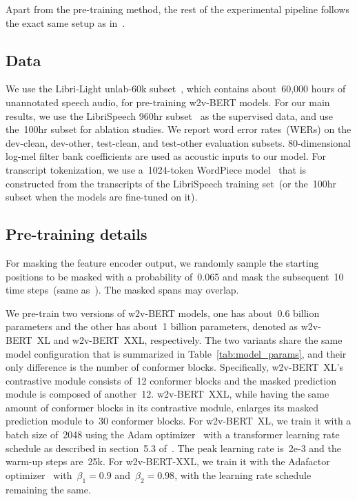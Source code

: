 \documentclass{article}
\begin{document}
Apart from the pre-training method, the rest of the experimental pipeline follows the exact same setup as in~\cite{zhang2020pushing}.

\subsection{Data}
We use the Libri-Light unlab-60k subset~\cite{kahn2020libri}, which contains about~60,000 hours of unannotated speech audio, for pre-training w2v-BERT models.
For our main results, we use the LibriSpeech 960hr subset~\cite{panayotov2015librispeech} as the supervised data, and use the~100hr subset for ablation studies.
We report word error rates~(WERs) on the dev-clean, dev-other, test-clean, and test-other evaluation subsets.
80-dimensional log-mel filter bank coefficients are used as acoustic inputs to our model.
For transcript tokenization, we use a~1024-token WordPiece model~\cite{schuster2012japanese} that is constructed from the transcripts of the LibriSpeech training set~(or the~100hr subset when the models are fine-tuned on it).

\subsection{Pre-training details}
 For masking the feature encoder output, we randomly sample the starting positions to be masked with a probability of~0.065 and mask the subsequent~10 time steps~(same as~\cite{baevski2020wav2vec,zhang2020pushing}).
The masked spans may overlap.

 We pre-train two versions of w2v-BERT models, one has about~0.6 billion parameters and the other has about~1 billion parameters, denoted as w2v-BERT~XL and w2v-BERT~XXL, respectively.
The two variants share the same model configuration that is summarized in Table~\ref{tab:model_params}, and their only difference is the number of conformer blocks.
Specifically, w2v-BERT~XL's contrastive module consists of~12 conformer blocks and the masked prediction module is composed of another~12.
w2v-BERT~XXL, while having the same amount of conformer blocks in its contrastive module, enlarges its masked prediction module to~30 conformer blocks.
For w2v-BERT~XL, we train it with a batch size of~2048 using the Adam optimizer~\cite{kingma2015adam} with a transformer learning rate schedule as described in section~5.3 of~\cite{vaswani2017attention}.
The peak learning rate is~2e-3 and the warm-up steps are~25k.
For w2v-BERT-XXL, we train it with the Adafactor optimizer~\cite{shazeer2018adafactor} with~$\beta_{1} = 0.9$ and~$\beta_{2} = 0.98$, with the learning rate schedule remaining the same.
\end{document}

